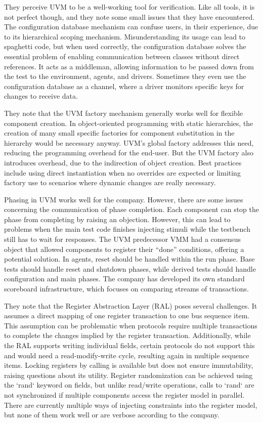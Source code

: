 They perceive UVM to be a well-working tool for verification. Like all tools, it is not perfect though, and they note
some small issues that they have encountered. The configuration database mechanism can confuse users, in their experience, due to its
hierarchical scoping mechanism. Misunderstanding its usage can lead to spaghetti code, but when used correctly, the
configuration database solves the essential problem of enabling communication between classes without direct references. It acts as
a middleman, allowing information to be passed down from the test to the environment, agents, and drivers. Sometimes
they even use the configuration database as a channel, where a driver monitors specific keys for changes to receive data.

They note that the UVM factory mechanism generally works well for flexible component creation. In object-oriented
programming with static hierarchies, the creation of many small specific factories for component substitution in the
hierarchy would be necessary anyway. UVM's global factory addresses this need, reducing the programming overhead for
the end-user. But the UVM factory also introduces overhead, due to the indirection of object creation. Best practices
include using direct instantiation when no overrides are expected or limiting factory use to scenarios where dynamic
changes are really necessary.

Phasing in UVM works well for the company. However, there are some issues concerning the communication of phase
completion. Each component can stop the phase from completing by raising an objection. However, this can lead to
problems when the main test code finishes injecting stimuli while the testbench still has to wait for responses. The
UVM predecessor VMM had a consensus object that allowed components to register their “done” conditions, offering a potential
solution. In agents, reset should be handled within the run phase. Base tests should handle reset and shutdown
phases, while derived tests should handle configuration and main phases. The company has developed its own standard
scoreboard infrastructure, which focuses on comparing streams of transactions.

They note that the Register Abstraction Layer (RAL) poses several challenges. It assumes a direct mapping of one
register transaction to one bus sequence item. This assumption can be problematic when protocols require multiple
transactions to complete the changes implied by the register transaction. Additionally, while the RAL supports
writing individual fields, certain protocols do not support this and would need a read-modify-write cycle, resulting
again in multiple sequence items. Locking registers by calling  is available but does not ensure
immutability, raising questions
about its utility. Register randomization can be achieved using the `rand` keyword on fields, but unlike read/write
operations, calls to `rand` are not synchronized if multiple components access the register model in parallel. There
are currently multiple ways of injecting constraints into the register model, but none of them work well or are
verbose according to the company.

